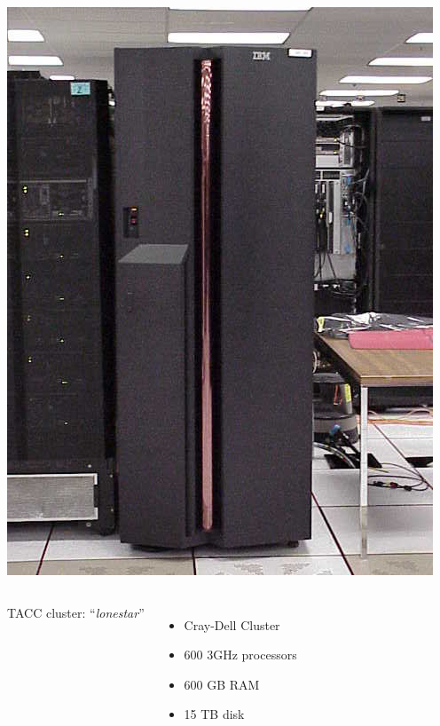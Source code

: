 \documentclass[compress,12pt]{beamer}
\begin{document}
\begin{frame}
{\begin{columns}
      \centerline{\includegraphics[width=\textwidth]{figures/p690_door}}
    \end{columns}
  }
  {
    \begin{columns}
      TACC cluster: ``\emph{lonestar}''
      \begin{itemize}
      \item Cray-Dell Cluster
      \item 600 3GHz processors
      \item 600 GB RAM
      \item 15 TB disk
      \end{itemize}


\end{columns}}
\end{frame}
\end{document}
